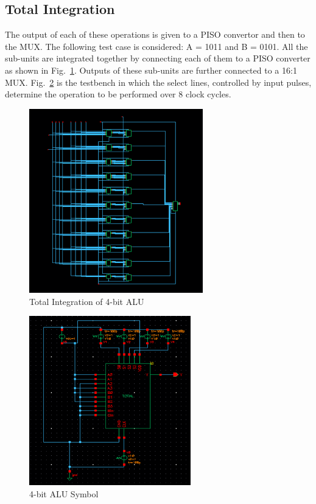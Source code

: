 \documentclass[conference]{IEEEtran}
\begin{document}
\subsection{Total Integration}\label{DC}
The output of each of these operations is given to a PISO convertor and then to the MUX. The following  test case  is considered:  A  =  1011 and B = 0101. All the sub-units are integrated together by connecting each of them to a PISO converter as shown in Fig.~\ref{fig8}. Outputs of these sub-units are further connected to a 16:1 MUX. Fig.~\ref{fig9} is the testbench in which the select lines, controlled by input pulses, determine the operation to be performed over 8 clock cycles.
\begin{figure}[htbp]
\centerline{\includegraphics[height=8cm,keepaspectratio,]{"ALU_Schematic.png"}}
\caption{Total Integration of 4-bit ALU }
\label{fig8}
\end{figure}
\begin{figure}[htbp]
\centerline{\includegraphics[width=7cm,keepaspectratio,]{"ALU_Symbol.png"}}
\caption{4-bit ALU Symbol }
\label{fig9}
\end{figure}
\end{document}
